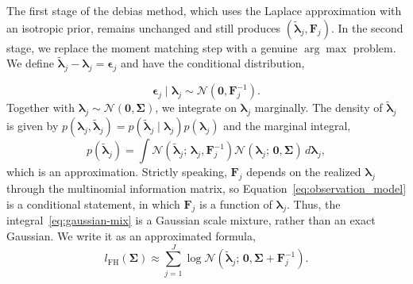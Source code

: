The first stage of the debias method, which uses the Laplace approximation with an isotropic prior, remains unchanged and still produces $(\tilde{\bm{\lambda}}_j,\mathbf{F}_j)$. In the second stage, we replace the moment matching step with a genuine $\arg\max$ problem. We define $\tilde{\bm{\lambda}}_{j}-\bm{\lambda}_{j}=\bm{\epsilon}_j$ and have the conditional distribution,

\begin{equation} 
    \bm{\epsilon}_{j}\mid \bm{\lambda}_{j} \sim \mathcal{N}\left(\mathbf{0}, \mathbf{F}_j^{-1}\right). 
    \label{eq:observation_model} 
\end{equation} 
Together with $\bm{\lambda}_{j}\sim \mathcal{N}\left(\bm{0},\bm{\Sigma}\right)$, we integrate on $\bm{\lambda}_{j}$ marginally. The density of $\tilde{\bm{\lambda}}_{j}$ is given by $p\left(\bm{\lambda}_{j},\tilde{\bm{\lambda}}_{j}\right)=p\left(\tilde{\bm{\lambda}}_{j}\mid \bm{\lambda}_{j}\right)p\left(\bm{\lambda}_{j}\right)$ and the marginal integral,
\begin{equation}
    p\left(\tilde{\bm{\lambda}}_{j}\right)=\int \mathcal{N}\left( \tilde{\bm{\lambda}}_{j};\,\bm{\lambda}_j,\mathbf{F}_{j}^{-1}\right)\mathcal{N}\left(\bm{\lambda}_{j};\,\bm{0},\bm{\Sigma}\right)\,d\bm{\lambda}_{j},
    \label{eq:gaussian-mix}
\end{equation}
which is an approximation. Strictly speaking, $\mathbf{F}_j$ depends on the realized $\bm{\lambda}_j$ through the multinomial information matrix, so Equation~\eqref{eq:observation_model} is a conditional statement, in which $\mathbf{F}_{j}$ is a function of $\bm{\lambda}_{j}$.
Thus, the integral~\eqref{eq:gaussian-mix} is a Gaussian scale mixture, rather than an exact Gaussian.
We write it as an approximated formula,
\begin{equation} 
    l_{\mathrm{FH}}(\bm{\Sigma}) \approx \sum_{j=1}^{J} \log \mathcal{N}\left(\tilde{\bm{\lambda}}_j;\, \mathbf{0}, \bm{\Sigma} + \mathbf{F}_j^{-1}\right). 
    \label{eq:fh-marginal-likelihood} 
\end{equation}
